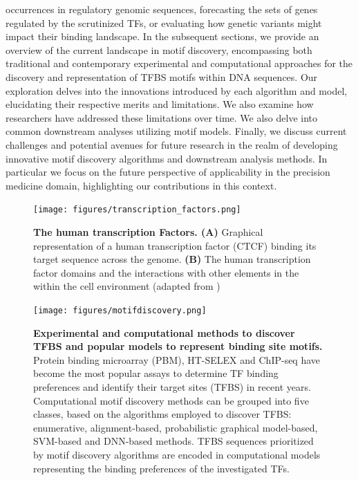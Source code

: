 \documentclass[a4paper, titlepage, openright]{book}
\begin{document}
occurrences in regulatory genomic sequences, forecasting the sets of genes regulated by the scrutinized TFs, or evaluating how genetic variants might impact their binding landscape. In the subsequent sections, we provide an overview of the current landscape in motif discovery, encompassing both traditional and contemporary experimental and computational approaches for the discovery and representation of TFBS motifs within DNA sequences. Our exploration delves into the innovations introduced by each algorithm and model, elucidating their respective merits and limitations. We also examine how researchers have addressed these limitations over time. We also delve into common downstream analyses utilizing motif models. Finally, we discuss current challenges and potential avenues for future research in the realm of developing innovative motif discovery algorithms and downstream analysis methods. In particular we focus on the future perspective of applicability in the precision medicine domain, highlighting our contributions in this context.

\begin{figure}
	\centering
	\texttt{[image: figures/transcription\_factors.png]}
	\caption[The human transcription Factors]{\textbf{The human transcription Factors. (A)} Graphical representation of a human transcription factor (CTCF) binding its target sequence across the genome. \textbf{(B)} The human transcription factor domains and the interactions with other elements in the within the cell environment (adapted from \cite{lambert2018human})}
	\label{fig:transcription_factors}
\end{figure}

\begin{figure}
	\centering
	\texttt{[image: figures/motifdiscovery.png]}
	\caption[Experimental and computational methods to discover TFBS and popular models to represent binding site motifs]{\textbf{Experimental and computational methods to discover TFBS and popular models to represent binding site motifs.} Protein binding microarray (PBM), HT-SELEX and ChIP-seq have become the most popular assays to determine TF binding preferences and identify their target sites (TFBS) in recent years. Computational motif discovery methods can be grouped into five classes, based on the algorithms employed to discover TFBS: enumerative, alignment-based, probabilistic graphical model-based, SVM-based and DNN-based methods. TFBS sequences prioritized by motif discovery algorithms are encoded in computational models representing the binding preferences of the investigated TFs.}
	\label{fig:motif_discovery}
\end{figure}
\end{document}
